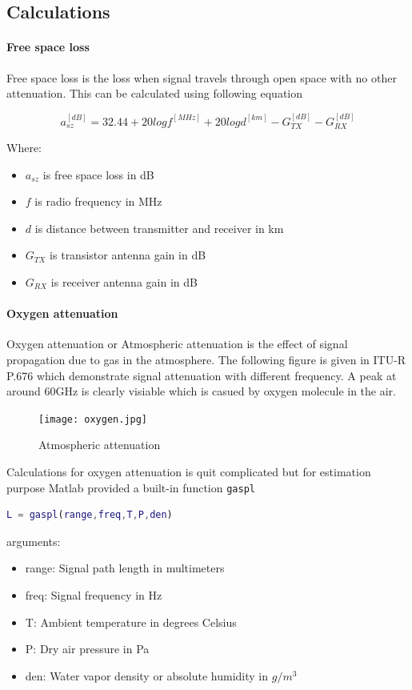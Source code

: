 \documentclass[
11pt, %
a4paper, %
oneside, %
headinclude,footinclude, %
BCOR5mm, %
]{scrartcl}
\begin{document}
\newpage
\subsection{Calculations}
\paragraph{Free space loss}
Free space loss is the loss when signal travels through open space with no
other attenuation. This can be calculated using following equation \cite{openspace}

\begin{equation}
    a_{sz}^{[dB]} = 32.44 + 20log f^{[MHz]}+20log d^{[km]} - G_{TX}^{[dB]} - G_{RX}^{[dB]}
    \label{eq:openspace}
\end{equation}

Where:
\begin{itemize}
    \item $a_{sz}$ is free space loss in dB
    \item $f$ is radio frequency in MHz
    \item $d$ is distance between transmitter and receiver in km 
    \item $G_{TX}$ is transistor antenna gain in dB
    \item $G_{RX}$ is receiver antenna gain in dB
\end{itemize}
\paragraph{Oxygen attenuation}
Oxygen attenuation or Atmospheric attenuation is the effect of signal propagation due to
gas in the atmosphere. The following figure is given in ITU-R P.676 \cite{oxygen} which
demonstrate signal attenuation with different frequency. A peak at around 60GHz is 
clearly visiable which is casued by oxygen molecule in the air.

\begin{figure}[h!]
    \centering
    \texttt{[image: oxygen.jpg]}
    \caption{Atmospheric attenuation}
    \label{fig:Atmospheric attenuation}
\end{figure}

Calculations for oxygen attenuation is quit complicated but for estimation 
purpose Matlab provided a built-in function \verb|gaspl|

\begin{lstlisting}[language=Matlab]
    L = gaspl(range,freq,T,P,den)
\end{lstlisting}
arguments:
\begin{itemize}
    \item range: Signal path length in multimeters
    \item freq: Signal frequency in Hz
    \item T: Ambient temperature in degrees Celsius
    \item P: Dry air pressure in Pa 
    \item den: Water vapor density or absolute humidity in $g/m^3$
\end{itemize}
\end{document}
